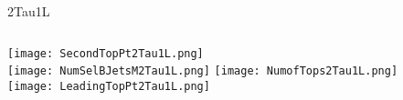 \documentclass{beamer}
\begin{document}
\begin{frame}{2Tau1L}
    \begin{columns}[t]
    \centering
    \texttt{[image: SecondTopPt2Tau1L.png]}\\
    \texttt{[image: NumSelBJetsM2Tau1L.png]}
    \centering
    \texttt{[image: NumofTops2Tau1L.png]}\\
    \texttt{[image: LeadingTopPt2Tau1L.png]}
    \end{columns}
\end{frame}
\end{document}
